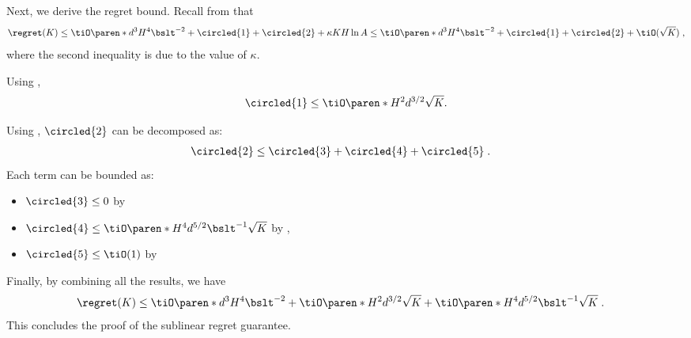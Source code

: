 Next, we derive the regret bound.
Recall from  that
\begin{align*}
\regret(K) \leq     
\tiO\paren*{d^3H^4 \bslt^{-2}}
+ 
\circled{1}
+
\circled{2}
+ \kappa KH \ln A
\leq     
\tiO\paren*{d^3H^4 \bslt^{-2}}
+ 
\circled{1}
+
\circled{2}
+ \tiO(\sqrt{K})\;,
\end{align*}
where the second inequality is due to the value of $\kappa$.

Using , 
$$
\circled{1} \leq 
\tiO\paren*{H^{2} d^{3/2}\sqrt{K}}.
$$

Using , $\circled{2}$ can be decomposed as:
\begin{align*}
\circled{2} &\leq \circled{3} + \circled{4} + \circled{5}\;.
\end{align*}
Each term can be bounded as:
\begin{itemize}
\item $\circled{3} \leq 0$ by 
\item $\circled{4} \leq \tiO\paren*{H^{4} d^{5/2} \bslt^{-1}\sqrt{K}}$ by ,
\item $\circled{5} \leq \tiO(1)$ by 
\end{itemize}

Finally, by combining all the results, we have 
\begin{align*}
\regret(K) &\leq 
\tiO\paren*{d^3H^4 \bslt^{-2}}
+ 
\tiO\paren*{H^{2} d^{3/2}\sqrt{K}}
+ 
\tiO\paren*{H^{4} d^{5/2} \bslt^{-1}\sqrt{K}}\;.
\end{align*}
This concludes the proof of the sublinear regret guarantee.
